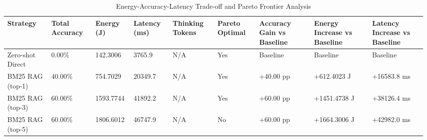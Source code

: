 \begin{table}
\caption{Energy-Accuracy-Latency Trade-off and Pareto Frontier Analysis}
\label{tab:tradeoff_comparison}
\begin{tabular}{lllllllll}
\toprule
Strategy & Total Accuracy & Energy (J) & Latency (ms) & Thinking Tokens & Pareto Optimal & Accuracy Gain vs Baseline & Energy Increase vs Baseline & Latency Increase vs Baseline \\
\midrule
Zero-shot Direct & 0.00\% & 142.3006 & 3765.9 & N/A & Yes & Baseline & Baseline & Baseline \\
BM25 RAG (top-1) & 40.00\% & 754.7029 & 20349.7 & N/A & Yes & +40.00 pp & +612.4023 J & +16583.8 ms \\
BM25 RAG (top-3) & 60.00\% & 1593.7744 & 41892.2 & N/A & Yes & +60.00 pp & +1451.4738 J & +38126.4 ms \\
BM25 RAG (top-5) & 60.00\% & 1806.6012 & 46747.9 & N/A & No & +60.00 pp & +1664.3006 J & +42982.0 ms \\
\bottomrule
\end{tabular}
\end{table}
